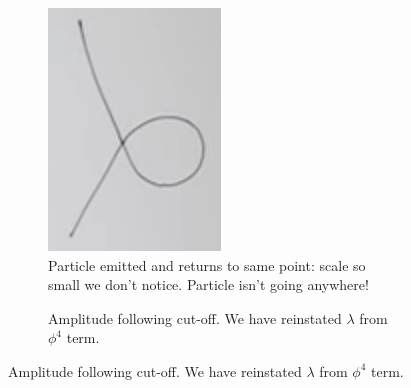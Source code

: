 \documentclass[]{article}
\begin{document}
\begin{figure}[H]
	\caption{Mimicking the Vertex}\label{fig:mimicking:vertex}
	\begin{subfigure}[t]{0.3\textwidth}
		\caption{Particle emitted and returns to same point: scale so small we don't notice. Particle isn't going anywhere!}\label{fig:3-1-feynman-mimic}
		\includegraphics[width=\textwidth]{3-1-feynman-mimic}
	\end{subfigure}
	\begin{subfigure}[t]{0.3\textwidth}
		\caption{Amplitude following cut-off. We have reinstated $\lambda$ from $\phi^4$ term.}\label{fig:3-1-cutoff}

\end{subfigure}
\end{figure}
\end{document}
